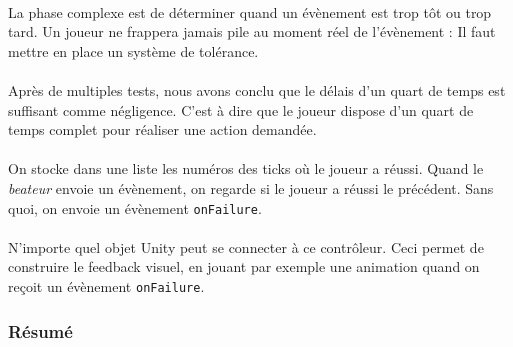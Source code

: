 \paragraph{}

La phase complexe est de déterminer quand un évènement est trop tôt ou trop tard. Un joueur ne frappera jamais pile au moment réel de l'évènement : Il faut mettre en place un système de tolérance.
\\\\
Après de multiples tests, nous avons conclu que le délais d'un quart de temps est suffisant comme négligence. C'est à dire que le joueur dispose d'un quart de temps complet pour réaliser une action demandée.
\\\\
On stocke dans une liste les numéros des ticks où le joueur a réussi. Quand le \textit{beateur} envoie un évènement, on regarde si le joueur a réussi le précédent. Sans quoi, on envoie un évènement \texttt{onFailure}.
\\\\
N'importe quel objet Unity peut se connecter à ce contrôleur. Ceci permet de construire le feedback visuel, en jouant par exemple une animation quand on reçoit un évènement \texttt{onFailure}.

\subsubsection{Résumé}
\label{engine_summary}
\noindent
{}
\paragraph{}

